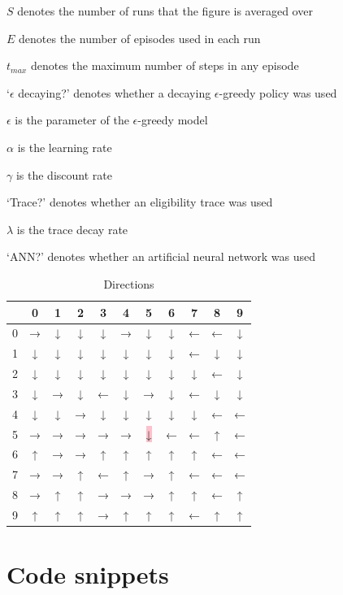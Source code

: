 \documentclass[a4paper, 11pt, twocolumn, draft]{article} %
\begin{document}
\begin{itemize*}
  \item $S$ denotes the number of runs that the figure is averaged over
  \item $E$ denotes the number of episodes used in each run
  \item $t_{max}$ denotes the maximum number of steps in any episode
  \item `$\epsilon$ decaying?' denotes whether a decaying $\epsilon$-greedy
    policy was used
  \item $\epsilon$ is the parameter of the $\epsilon$-greedy model
  \item $\alpha$ is the learning rate
  \item $\gamma$ is the discount rate
  \item `Trace?' denotes whether an eligibility trace was used
  \item $\lambda$ is the trace decay rate
  \item `ANN?' denotes whether an artificial neural network was used
\end{itemize*}

\begin{table}[H]
  \centering
  \begin{tabular}{r | c c c c c c c c c c}
    \hline
      & 0 & 1 & 2 & 3 & 4 & 5 & 6 & 7 & 8 & 9 \\
    \hline
    0 & → & ↓ & ↓ & ↓ & → & ↓ & ↓ & ← & ← & ↓ \\
    1 & ↓ & ↓ & ↓ & ↓ & ↓ & ↓ & ↓ & ← & ↓ & ↓ \\
    2 & ↓ & ↓ & ↓ & ↓ & ↓ & ↓ & ↓ & ↓ & ← & ↓ \\
    3 & ↓ & → & ↓ & ← & ↓ & → & ↓ & ← & ↓ & ↓ \\
    4 & ↓ & ↓ & → & ↓ & ↓ & ↓ & ↓ & ↓ & ← & ← \\
    5 & → & → & → & → & → & \colorbox{pink}{↓} & ← & ← & ↑ & ← \\
    6 & ↑ & → & → & ↑ & ↑ & ↑ & ↑ & ↑ & ← & ← \\
    7 & → & → & ↑ & ← & ↑ & → & ↑ & ← & ← & ← \\
    8 & → & ↑ & ↑ & → & → & → & ↑ & ↑ & ← & ↑ \\
    9 & ↑ & ↑ & ↑ & → & ↑ & ↑ & ↑ & ← & ↑ & ↑ \\
    \hline
  \end{tabular}
  \caption{Directions}
  \label{tab:computed_directions}
\end{table}

\section{Code snippets} \label{sec:code}
\end{document}
